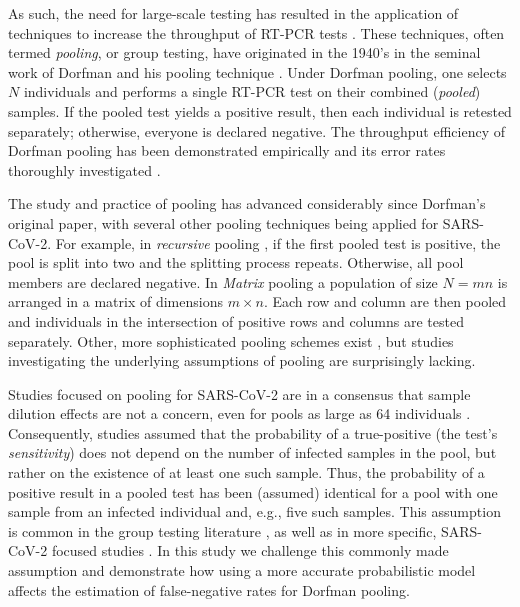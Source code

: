 \documentclass{article}
\begin{document}
As such, the need for large-scale testing has resulted in the
application of techniques to increase the throughput of RT-PCR tests
\cite{DorfmanYuvalDor, PoolSize30, BayesianDorfman, MatrixPooling,
  LionDorfman, CherifReview}. These techniques, often termed
\emph{pooling}, or group testing, have originated in the 1940's in the
seminal work of Dorfman and his pooling technique
\cite{DorfmanOriginal, DorfmanYuvalDor}. Under Dorfman pooling, one
selects $N$ individuals and performs a single RT-PCR test on their
combined (\emph{pooled}) samples. If the pooled test yields a positive
result, then each individual is retested separately; otherwise,
everyone is declared negative. The throughput efficiency of Dorfman
pooling has been demonstrated empirically \cite{DorfmanYuvalDor} and
its error rates thoroughly investigated \cite{Kim, Simplistic1,
  OptimalDorfmanPool}.
  
The study and practice of pooling has advanced considerably since
Dorfman's original paper, with several other pooling techniques being
applied for SARS-CoV-2.  For example, in \emph{recursive} pooling
\cite{Kim,RecursiveSevenFold}, if the first pooled test is positive,
the pool is split into two and the splitting process
repeats. Otherwise, all pool members are declared negative.  In
\emph{Matrix} pooling \cite{MatrixPooling} a population of size $N=mn$
is arranged in a matrix of dimensions $m\times n$. Each row and column
are then pooled and individuals in the intersection of positive rows
and columns are tested separately. Other, more sophisticated pooling
schemes exist \cite{CompressedPooling}, but studies investigating the
underlying assumptions of pooling are surprisingly lacking.

Studies focused on pooling for SARS-CoV-2 are in a consensus that
sample dilution effects \cite{DilutionHIV, GroupDilution} are not a
concern, even for pools as large as 64 individuals \cite{PoolSize30,
  Lion, DorfmanYuvalDor, DilutionCOVID, CherifReview}. Consequently,
studies assumed that the probability of a true-positive (the test's
\emph{sensitivity}) does not depend on the number of infected samples
in the pool, but rather on the existence of at least one such
sample. Thus, the probability of a positive result in a pooled test
has been (assumed) identical for a pool with one sample from an
infected individual and, e.g., five such samples. This assumption is
common in the group testing literature \cite{Kim, OptimalDorfmanPool,
  CherifReview}, as well as in more specific, SARS-CoV-2 focused
studies \cite{Simplistic1, Simplistic2}. In this study we challenge
this commonly made assumption and demonstrate how using a more accurate
probabilistic model affects the estimation of false-negative rates for
Dorfman pooling.
\end{document}
